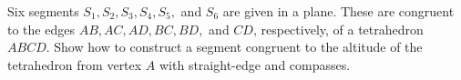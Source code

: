 Six segments $S_1, S_2, S_3, S_4, S_5,$ and $S_6$ are given in a plane. These are congruent to the edges $AB, AC, AD, BC, BD,$ and $CD$,  respectively, of a tetrahedron $ABCD$. Show how to construct a segment congruent to the altitude of the tetrahedron from vertex $A$ with straight-edge and compasses.